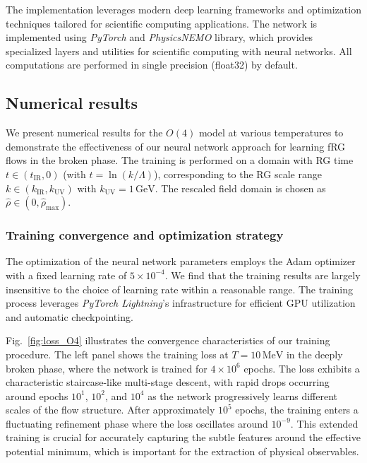 \documentclass[reprint,twocolumn,superscriptaddress,preprintnumbers,amsmath,amssymb,aps,prd,floatfix]{revtex4-2}
\def\Fig#1{Fig.~\ref{#1}}
\begin{document}
The implementation leverages modern deep learning frameworks and optimization techniques tailored for scientific computing applications. The network is implemented using \textit{PyTorch} and \textit{PhysicsNEMO} library, which provides specialized layers and utilities for scientific computing with neural networks. All computations are performed in single precision (float32) by default.

\subsection{Numerical results}
We present numerical results for the $O(4)$ model at various temperatures to demonstrate the effectiveness of our neural network approach for learning fRG flows in the broken phase. The training is performed on a domain with RG time $t \in (t_{\mathrm{IR}}, 0)$ (with $t=\ln(k/\Lambda)$), corresponding to the RG scale range $k \in (k_{\mathrm{IR}}, k_{\mathrm{UV}})$ with $k_{\mathrm{UV}} = 1\,\mathrm{GeV}$. The rescaled field domain is chosen as $\hat{\rho} \in (0, \hat{\rho}_{\mathrm{max}})$.

\subsubsection{Training convergence and optimization strategy}

The optimization of the neural network parameters employs the Adam optimizer with a fixed learning rate of $5 \times 10^{-4}$. We find that the training results are largely insensitive to the choice of learning rate within a reasonable range. The training process leverages \textit{PyTorch Lightning}'s infrastructure for efficient GPU utilization and automatic checkpointing.

\Fig{fig:loss_O4} illustrates the convergence characteristics of our training procedure. The left panel shows the training loss at $T=10\,\mathrm{MeV}$ in the deeply broken phase, where the network is trained for $4 \times 10^6$ epochs. The loss exhibits a characteristic staircase-like multi-stage descent, with rapid drops occurring around epochs $10^1$, $10^2$, and $10^4$ as the network progressively learns different scales of the flow structure. After approximately $10^5$ epochs, the training enters a fluctuating refinement phase where the loss oscillates around $10^{-9}$. This extended training is crucial for accurately capturing the subtle features around the effective potential minimum, which is important for the extraction of physical observables.
\end{document}
